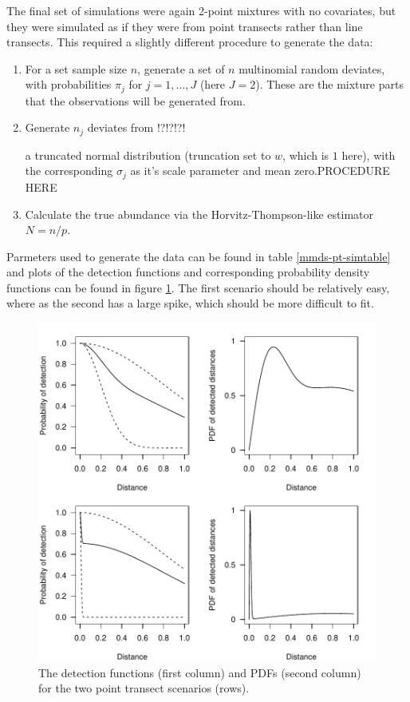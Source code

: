 The final set of simulations were again 2-point mixtures with no covariates, but they were simulated as if they were from point transects rather than line transects. This required a slightly different procedure to generate the data:
\begin{enumerate}
	\item For a set sample size $n$, generate a set of $n$ multinomial random deviates, with probabilities $\pi_j$ for $j=1,\ldots, J$ (here $J=2$). These are the mixture parts that the observations will be generated from.
	\item Generate $n_j$ deviates from 
!?!?!?!


a truncated normal distribution (truncation set to $w$, which is $1$ here), with the corresponding $\sigma_j$ as it's scale parameter and mean zero.PROCEDURE HERE
	\item Calculate the true abundance via the Horvitz-Thompson-like estimator $N=n/p$.
\end{enumerate}

Parmeters used to generate the data can be found in table \ref{mmds-pt-simtable} and plots of the detection functions and corresponding probability density functions can be found in figure \ref{mmds-pt-funcs}. The first scenario should be relatively easy, where as the second has a large spike, which should be more difficult to fit.

\begin{figure}
\centering
\includegraphics[width=6in]{mix/figs/pt-detfct.pdf}
\caption{The detection functions (first column) and PDFs (second column) for the two point transect scenarios (rows).}
\label{mmds-pt-funcs}
\end{figure}

